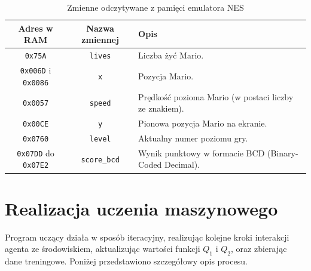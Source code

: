 \begin{table}[ht]
	\centering
	\caption{Zmienne odczytywane z pamięci emulatora NES}
	\label{tab:nes_memory}
	\begin{tabular}{|c|c|p{5cm}|}
		\hline
		\textbf{Adres w RAM}               & \textbf{Nazwa zmiennej} & \textbf{Opis}                                         \\ \hline
		\texttt{0x75A}                     & \texttt{lives}          & Liczba żyć Mario.                                     \\ \hline
		\texttt{0x006D} i \texttt{0x0086}  & \texttt{x}              & Pozycja Mario.                                        \\ \hline
		\texttt{0x0057}                    & \texttt{speed}          & Prędkość pozioma Mario (w postaci liczby ze znakiem). \\ \hline
		\texttt{0x00CE}                    & \texttt{y}              & Pionowa pozycja Mario na ekranie.                     \\ \hline
		\texttt{0x0760}                    & \texttt{level}          & Aktualny numer poziomu gry.                           \\ \hline
		\texttt{0x07DD} do \texttt{0x07E2} & \texttt{score\_bcd}     & Wynik punktowy w formacie BCD (Binary-Coded Decimal). \\ \hline
	\end{tabular}
\end{table}
\section{Realizacja uczenia maszynowego}

Program uczący działa w sposób iteracyjny, realizując kolejne kroki interakcji agenta ze środowiskiem, aktualizując wartości funkcji \(Q_1\) i \(Q_2\), oraz zbierając dane treningowe. Poniżej przedstawiono szczegółowy opis procesu.

